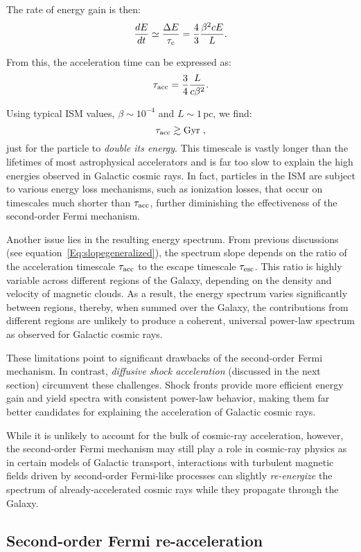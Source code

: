 The rate of energy gain is then:
\[
\frac{dE}{dt} \simeq \frac{\Delta E}{\tau_{\rm c}} = \frac{4}{3} \frac{\beta^2 c E}{L}.
\]

From this, the acceleration time can be expressed as:
\[
\tau_{\rm acc} = \frac{3}{4} \frac{L}{c \beta^2}.
\]

Using typical ISM values, \( \beta \sim 10^{-4} \) and \( L \sim 1 \, \text{pc} \), we find:
\[
\tau_{\rm acc} \gtrsim \text{Gyr}~,
\]
just for the particle to \emph{double its energy}. This timescale is vastly longer than the lifetimes of most astrophysical accelerators and is far too slow to explain the high energies observed in Galactic cosmic rays. In fact, particles in the ISM are subject to various energy loss mechanisms, such as ionization losses, that occur on timescales much shorter than \( \tau_{\rm acc} \), further diminishing the effectiveness of the second-order Fermi mechanism.

Another issue lies in the resulting energy spectrum. From previous discussions (see equation~\ref{Eq:slopegeneralized}), the spectrum slope depends on the ratio of the acceleration timescale \( \tau_{\rm acc} \) to the escape timescale \( \tau_{\rm esc} \). This ratio is highly variable across different regions of the Galaxy, depending on the density and velocity of magnetic clouds. As a result, the energy spectrum varies significantly between regions, thereby, when summed over the Galaxy, the contributions from different regions are unlikely to produce a coherent, universal power-law spectrum as observed for Galactic cosmic rays.

These limitations point to significant drawbacks of the second-order Fermi mechanism.
%
In contrast, \emph{diffusive shock acceleration} (discussed in the next section) circumvent these challenges. Shock fronts provide more efficient energy gain and yield spectra with consistent power-law behavior, making them far better candidates for explaining the acceleration of Galactic cosmic rays.

While it is unlikely to account for the bulk of cosmic-ray acceleration, however, the second-order Fermi mechanism may still play a role in cosmic-ray physics as in certain models of Galactic transport, interactions with turbulent magnetic fields driven by second-order Fermi-like processes can slightly \emph{re-energize} the spectrum of already-accelerated cosmic rays while they propagate through the Galaxy.

\subsection{Second-order Fermi re-acceleration}

